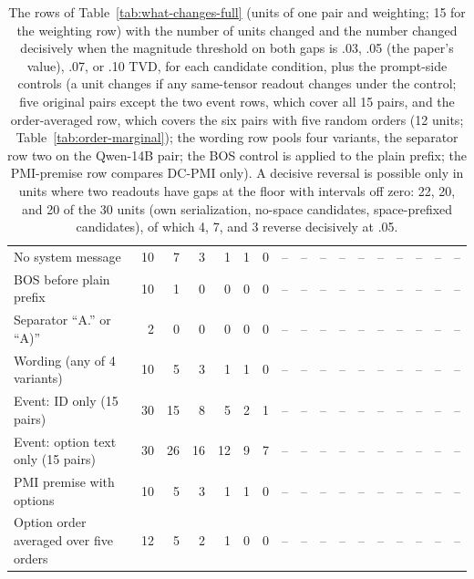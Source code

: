 \begin{table}[t]
\begin{tabular}{@{}lrrrrrrrrrrrrrrrr@{}}
No system message & 10 & 7 & 3 & 1 & 1 & 0 & -- & -- & -- & -- & -- & -- & -- & -- & -- & -- \\
BOS before plain prefix & 10 & 1 & 0 & 0 & 0 & 0 & -- & -- & -- & -- & -- & -- & -- & -- & -- & -- \\
Separator ``A.'' or ``A)'' & 2 & 0 & 0 & 0 & 0 & 0 & -- & -- & -- & -- & -- & -- & -- & -- & -- & -- \\
Wording (any of 4 variants) & 10 & 5 & 3 & 1 & 1 & 0 & -- & -- & -- & -- & -- & -- & -- & -- & -- & -- \\
Event: ID only (15 pairs) & 30 & 15 & 8 & 5 & 2 & 1 & -- & -- & -- & -- & -- & -- & -- & -- & -- & -- \\
Event: option text only (15 pairs) & 30 & 26 & 16 & 12 & 9 & 7 & -- & -- & -- & -- & -- & -- & -- & -- & -- & -- \\
PMI premise with options & 10 & 5 & 3 & 1 & 1 & 0 & -- & -- & -- & -- & -- & -- & -- & -- & -- & -- \\
Option order averaged over five orders & 12 & 5 & 2 & 1 & 0 & 0 & -- & -- & -- & -- & -- & -- & -- & -- & -- & -- \\
\bottomrule
\end{tabular}
\caption{The rows of Table~\ref{tab:what-changes-full} (units of one pair and weighting; 15 for the weighting row) with the number of units changed and the number changed decisively when the magnitude threshold on both gaps is .03, .05 (the paper's value), .07, or .10 TVD, for each candidate condition, plus the prompt-side controls (a unit changes if any same-tensor readout changes under the control; five original pairs except the two event rows, which cover all 15 pairs, and the order-averaged row, which covers the six pairs with five random orders (12 units; Table~\ref{tab:order-marginal}); the wording row pools four variants, the separator row two on the Qwen-14B pair; the BOS control is applied to the plain prefix; the PMI-premise row compares DC-PMI only). A decisive reversal is possible only in units where two readouts have gaps at the floor with intervals off zero: 22, 20, and 20 of the 30 units (own serialization, no-space candidates, space-prefixed candidates), of which 4, 7, and 3 reverse decisively at .05.}
\label{tab:threshold-sweep}
\end{table}
